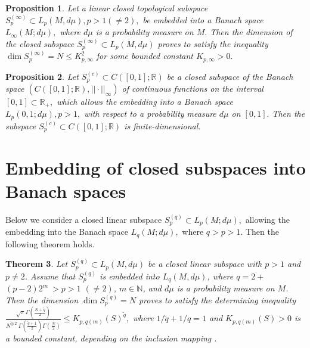 \documentclass[pdflatex,sn-mathphys-num]{sn-jnl}%
\theoremstyle{thmstyleone}%
\newtheorem{theorem}{Theorem}%
\newtheorem{proposition}[theorem]{Proposition}%
\theoremstyle{thmstyletwo}%
\theoremstyle{thmstylethree}%
\begin{document}
\begin{proposition}
	Let a linear closed topological subspace $S_{p}^{(\infty )}\subset
	L_{p}(M,d\mu ),p>1(\neq 2),$ be embedded into a Banach space $%
	L_{\infty }(M;d\mu ),$ where $d\mu $ is a probability measure on $M.$ Then
	the dimension of the closed subspace $S_{p}^{(\infty )}\subset L_{p}(M,d\mu
	) $ proves to satisfy the inequality $\dim S_{p}^{(\infty )}=N\leq
	K_{p,\infty }^{2}$ for some bounded constant $K_{p,\infty }>0.$
\end{proposition}

\begin{proposition}
	Let $S_{p}^{(c)}\subset C([0,1];\mathbb{R})$ be a closed subspace of the
	Banach space $(C([0,1];\mathbb{R}),||\cdot ||_{\infty })$ of continuous
	functions on the interval $[0,1]\subset \mathbb{R}_{+},$ which allows the
	embedding into a Banach space $L_{p}(0,1;d\mu ),p>1,$ with respect
	to a probability measure $d\mu $ on $[0,1].$ Then the subspace $%
	S_{p}^{(c)}\subset C([0,1];\mathbb{R})$ is finite-dimensional.
\end{proposition}

\section{Embedding of closed subspaces into Banach spaces}

Below we consider a closed linear subspace $S_{p}^{(q)}\subset L_{p}(M;d\mu
),$ allowing the embedding into the Banach space $L_{q}(M;d\mu ), $
where $q>p>1.$ Then the following theorem holds.

\begin{theorem}
	\label{Tm_2} Let $S_{p}^{(q)}\subset L_{p}(M,d\mu )$ be a closed linear
	subspace with $p>1$ and $p\neq 2$. Assume that $S_{p}^{(q)}$ is
	embedded into $L_{q}(M,d\mu )$, where $q=2+$ $(p-2)2^{m}\ >p>1$ $(\neq 2)$, $%
	m\in \mathbb{N}$, and $d\mu $ is a probability measure on $M$. Then the
	dimension $\dim S_{p}^{(q)}=N$ proves to satisfy the determining inequality $%
	\frac{\sqrt{\pi }\Gamma (\frac{N+\tilde{q}}{2})}{N^{\tilde{q}/2}\ \Gamma (%
		\frac{\tilde{q}+1}{2})\Gamma (\frac{N}{2})}\leq K_{p,q(m)}(S)^{\tilde{q}},$
	where $1/\tilde{q}+1/q=1$ and $K_{p,q(m)}(S)>0$ is a bounded constant,
	depending on the inclusion mapping . 
\end{theorem}
\end{document}
